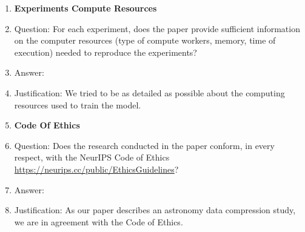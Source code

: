 \begin{enumerate}
\item {\bf Experiments Compute Resources}
    \item[] Question: For each experiment, does the paper provide sufficient information on the computer resources (type of compute workers, memory, time of execution) needed to reproduce the experiments?
    \item[] Answer: \answerYes{} %
    \item[] Justification: We tried to be as detailed as possible about the computing resources used to train the model.  
    
\item {\bf Code Of Ethics}
    \item[] Question: Does the research conducted in the paper conform, in every respect, with the NeurIPS Code of Ethics \url{https://neurips.cc/public/EthicsGuidelines}?
    \item[] Answer: \answerYes{} %
    \item[] Justification: As our paper describes an astronomy data compression study, we are in agreement with the Code of Ethics. 



\end{enumerate}
